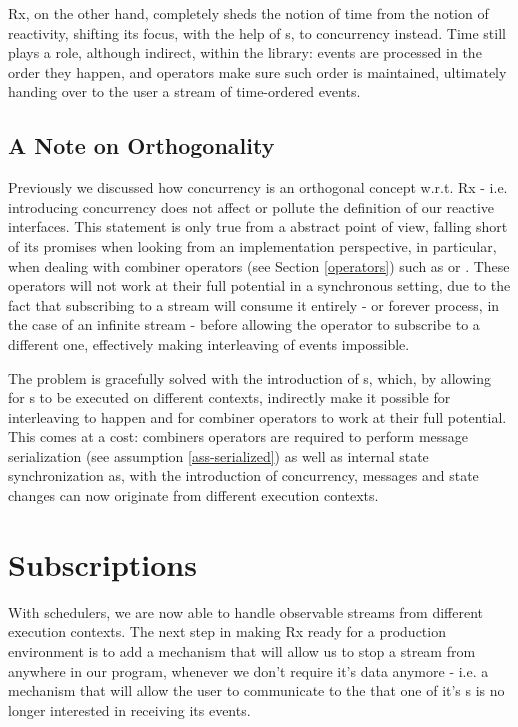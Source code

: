 Rx, on the other hand, completely sheds the notion of time from the notion of reactivity\cite{meijer2010observable}, shifting its focus, with the help of s, to concurrency instead. Time still plays a role, although indirect, within the library: events are processed in the order they happen, and operators make sure such order is maintained, ultimately handing over to the user a stream of time-ordered events.

\subsection{A Note on Orthogonality}

Previously we discussed how concurrency is an orthogonal concept w.r.t. Rx - i.e. introducing concurrency does not affect or pollute the definition of our reactive interfaces. This statement is only true from a abstract point of view, falling short of its promises when looking from an implementation perspective, in particular, when dealing with combiner operators (see Section \ref{operators}) such as \code{(>>=)} or . These operators will not work at their full potential in a synchronous setting, due to the fact that subscribing to a stream will consume it entirely - or forever process, in the case of an infinite stream - before allowing the operator to subscribe to a different one, effectively making interleaving of events impossible. 

The problem is gracefully solved with the introduction of s, which, by allowing for s to be executed on different contexts, indirectly make it possible for interleaving to happen and for combiner operators to work at their full potential. This comes at a cost: combiners operators are required to perform message serialization (see assumption \ref{ass-serialized}) as well as internal state synchronization as, with the introduction of concurrency, messages and state changes can now originate from different execution contexts.

\section{Subscriptions}
\label{sec:subscriptions}

With schedulers, we are now able to handle observable streams from different execution contexts. The next step in making Rx ready for a production environment is to add a mechanism that will allow us to stop a stream from anywhere in our program, whenever we don't require it's data anymore - i.e. a mechanism that will allow the user to communicate to the  that one of it's s is no longer interested in receiving its events. 

